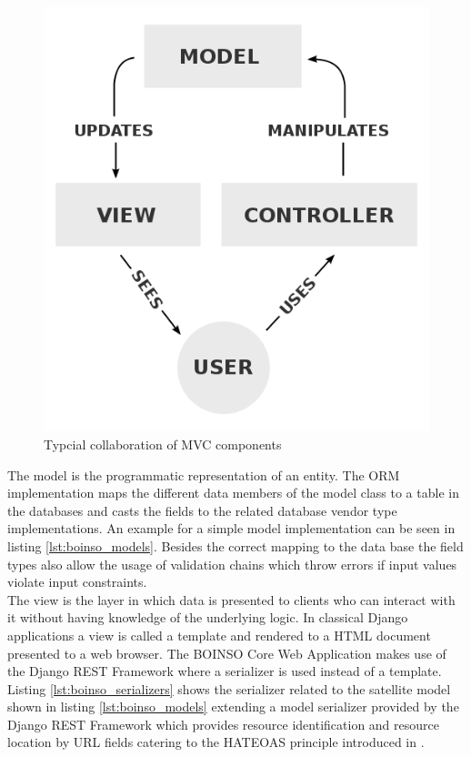 \documentclass[BachelorPaper]{subfiles}
\begin{document}
\begin{figure}[!htbp]
\centering
\includegraphics[width=0.5\linewidth]{PICs/BacPics/MVC-Process.png}
\caption{Typcial collaboration of MVC components}\label{fig:MVC}
\end{figure}

The model is the programmatic representation of an entity. The \ac{ORM} implementation maps the different data members of the model class to a table in the databases and casts the fields to the related database vendor type implementations. An example for a simple model implementation can be seen in listing \ref{lst:boinso_models}. Besides the correct mapping to the data base the field types also allow the usage of validation chains which throw errors if input values violate input constraints.\\



The view is the layer in which data is presented to clients who can interact with it without having knowledge of the underlying logic. In classical Django applications a view is called a template and rendered to a \ac{HTML} document presented to a web browser. The BOINSO Core Web Application makes use of the Django \ac{REST} Framework where a serializer is used instead of a template. Listing \ref{lst:boinso_serializers} shows the serializer related to the satellite model shown in listing \ref{lst:boinso_models} extending a model serializer provided by the Django \ac{REST} Framework which provides resource identification and resource location by \ac{URL} fields catering to the \ac{HATEOAS} principle introduced in \cite{Fielding_2000}.\\
\end{document}
